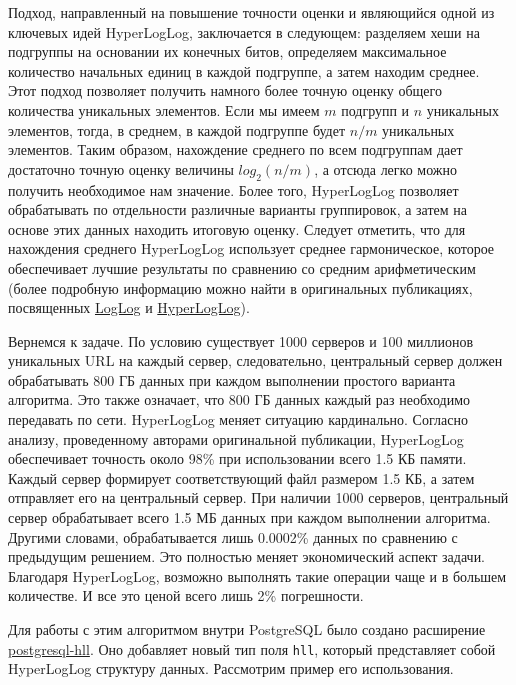 Подход, направленный на повышение точности оценки и являющийся одной из ключевых идей HyperLogLog, заключается в следующем: разделяем хеши на подгруппы на основании их конечных битов, определяем максимальное количество начальных единиц в каждой подгруппе, а затем находим среднее. Этот подход позволяет получить намного более точную оценку общего количества уникальных элементов. Если мы имеем $m$ подгрупп и $n$ уникальных элементов, тогда, в среднем, в каждой подгруппе будет $n/m$ уникальных элементов. Таким образом, нахождение среднего по всем подгруппам дает достаточно точную оценку величины $log_2{(n/m)}$, а отсюда легко можно получить необходимое нам значение. Более того, HyperLogLog позволяет обрабатывать по отдельности различные варианты группировок, а затем на основе этих данных находить итоговую оценку. Следует отметить, что для нахождения среднего HyperLogLog использует среднее гармоническое, которое обеспечивает лучшие результаты по сравнению со средним арифметическим (более подробную информацию можно найти в оригинальных публикациях, посвященных \href{http://www.ic.unicamp.br/~celio/peer2peer/math/bitmap-algorithms/durand03loglog.pdf}{LogLog} и \href{http://algo.inria.fr/flajolet/Publications/FlFuGaMe07.pdf}{HyperLogLog}).

Вернемся к задаче. По условию существует 1000 серверов и 100 миллионов уникальных URL на каждый сервер, следовательно, центральный сервер должен обрабатывать 800 ГБ данных при каждом выполнении простого варианта алгоритма. Это также означает, что 800 ГБ данных каждый раз необходимо передавать по сети. HyperLogLog меняет ситуацию кардинально. Согласно анализу, проведенному авторами оригинальной публикации, HyperLogLog обеспечивает точность около 98\% при использовании всего 1.5 КБ памяти. Каждый сервер формирует соответствующий файл размером 1.5 КБ, а затем отправляет его на центральный сервер. При наличии 1000 серверов, центральный сервер обрабатывает всего 1.5 МБ данных при каждом выполнении алгоритма. Другими словами, обрабатывается лишь 0.0002\% данных по сравнению с предыдущим решением. Это полностью меняет экономический аспект задачи. Благодаря HyperLogLog, возможно выполнять такие операции чаще и в большем количестве. И все это ценой всего лишь 2\% погрешности.

Для работы с этим алгоритмом внутри PostgreSQL было создано расширение \href{https://github.com/aggregateknowledge/postgresql-hll}{postgresql-hll}. Оно добавляет новый тип поля \lstinline!hll!, который представляет собой HyperLogLog структуру данных. Рассмотрим пример его использования.

